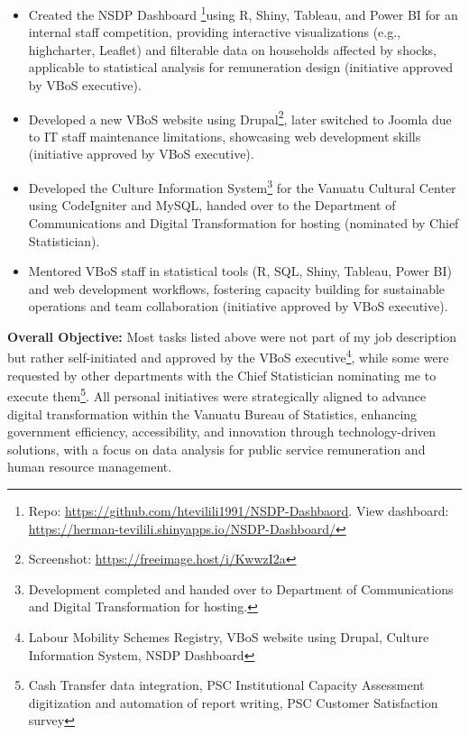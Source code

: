 \documentclass[
  letterpaper,
  DIV=11,
  numbers=noendperiod]{scrartcl}
\begin{document}
\begin{itemize}
{    \url{https://lmr.laravel.cloud/}.}, a Laravel (backend) and React.js
  (frontend) application with PostgreSQL\footnote{Initially developed
    with MySQL, but Laravel's flexibility enabled an easy migration to
    PostgreSQL.} integration for managing and visualizing labour
  mobility data, leveraging React.js as a single-page application (SPA)
  to load content dynamically, demonstrating web programming and
  database application development (initiative approved by VBoS
  executive).
\item
  Created the NSDP Dashboard \footnote{Repo:
    \url{https://github.com/htevilili1991/NSDP-Dashbaord}. View
    dashboard:
    \url{https://herman-tevilili.shinyapps.io/NSDP-Dashboard/}}using R,
  Shiny, Tableau, and Power BI for an internal staff competition,
  providing interactive visualizations (e.g., highcharter, Leaflet) and
  filterable data on households affected by shocks, applicable to
  statistical analysis for remuneration design (initiative approved by
  VBoS executive).
\item
  Developed a new VBoS website using Drupal\footnote{Screenshot:
    \url{https://freeimage.host/i/KwwzI2a}}, later switched to Joomla
  due to IT staff maintenance limitations, showcasing web development
  skills (initiative approved by VBoS executive).
\item
  Developed the Culture Information System\footnote{Development
    completed and handed over to Department of Communications and
    Digital Transformation for hosting.} for the Vanuatu Cultural Center
  using CodeIgniter and MySQL, handed over to the Department of
  Communications and Digital Transformation for hosting (nominated by
  Chief Statistician).
\item
  Mentored VBoS staff in statistical tools (R, SQL, Shiny, Tableau,
  Power BI) and web development workflows, fostering capacity building
  for sustainable operations and team collaboration (initiative approved
  by VBoS executive).
\end{itemize}

\textbf{Overall Objective:} Most tasks listed above were not part of my
job description but rather self-initiated and approved by the VBoS
executive\footnote{Labour Mobility Schemes Registry, VBoS website using
  Drupal, Culture Information System, NSDP Dashboard}, while some were
requested by other departments with the Chief Statistician nominating me
to execute them\footnote{Cash Transfer data integration, PSC
  Institutional Capacity Assessment digitization and automation of
  report writing, PSC Customer Satisfaction survey}. All personal
initiatives were strategically aligned to advance digital transformation
within the Vanuatu Bureau of Statistics, enhancing government
efficiency, accessibility, and innovation through technology-driven
solutions, with a focus on data analysis for public service remuneration
and human resource management.
\end{document}
